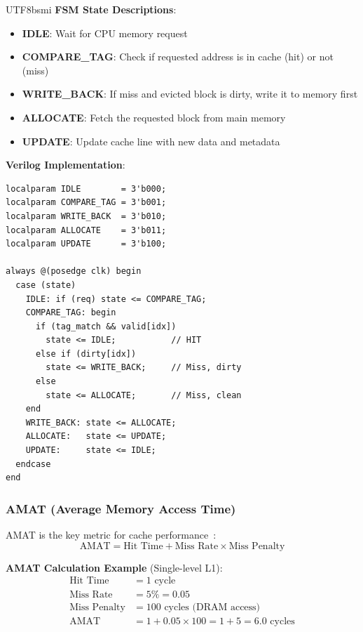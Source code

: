 \documentclass[journal,twoside]{IEEEtran}
\begin{document}
\begin{CJK}{UTF8}{bsmi}
\textbf{FSM State Descriptions}:
\begin{itemize}
    \item \textbf{IDLE}: Wait for CPU memory request
    \item \textbf{COMPARE\_TAG}: Check if requested address is in cache (hit) or not (miss)
    \item \textbf{WRITE\_BACK}: If miss and evicted block is dirty, write it to memory first
    \item \textbf{ALLOCATE}: Fetch the requested block from main memory
    \item \textbf{UPDATE}: Update cache line with new data and metadata
\end{itemize}

\textbf{Verilog Implementation}:
\begin{lstlisting}
localparam IDLE        = 3'b000;
localparam COMPARE_TAG = 3'b001;
localparam WRITE_BACK  = 3'b010;
localparam ALLOCATE    = 3'b011;
localparam UPDATE      = 3'b100;

always @(posedge clk) begin
  case (state)
    IDLE: if (req) state <= COMPARE_TAG;
    COMPARE_TAG: begin
      if (tag_match && valid[idx]) 
        state <= IDLE;           // HIT
      else if (dirty[idx]) 
        state <= WRITE_BACK;     // Miss, dirty
      else 
        state <= ALLOCATE;       // Miss, clean
    end
    WRITE_BACK: state <= ALLOCATE;
    ALLOCATE:   state <= UPDATE;
    UPDATE:     state <= IDLE;
  endcase
end
\end{lstlisting}

\subsubsection{AMAT (Average Memory Access Time)}
AMAT is the key metric for cache performance~\cite{hennessy2017computer}:
\begin{equation}
\text{AMAT} = \text{Hit Time} + \text{Miss Rate} \times \text{Miss Penalty}
\end{equation}

\textbf{AMAT Calculation Example} (Single-level L1):
\begin{align*}
\text{Hit Time} &= 1 \text{ cycle} \\
\text{Miss Rate} &= 5\% = 0.05 \\
\text{Miss Penalty} &= 100 \text{ cycles (DRAM access)} \\
\text{AMAT} &= 1 + 0.05 \times 100 = 1 + 5 = 6.0 \text{ cycles}
\end{align*}


\end{CJK}
\end{document}
